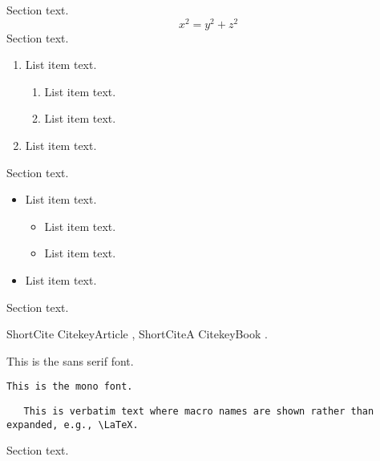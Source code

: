 \documentclass[published]{agujournal2025_4.22.25}
\begin{document}
Section text.
 \begin{equation}
 x^2=y^2 + z^2
 \end{equation}
Section text.
%
\begin{enumerate}
    \item List item text.
        \begin{enumerate} %
          \item List item text.
          \item List item text.
        \end{enumerate}
    \item List item text.
\end{enumerate}
Section text.
\begin{itemize}
    \item List item text.
        \begin{itemize}
          \item List item text. 
          \item List item text.
        \end{itemize}
    \item List item text.
\end{itemize}
Section text.

ShortCite CitekeyArticle \cite{CitekeyArticle}, ShortCiteA CitekeyBook . 

\textsf{This is the sans serif font.}

 \texttt{This is the mono font.}
 

\begin{verbatim}  
   This is verbatim text where macro names are shown rather than expanded, e.g., \LaTeX.
\end{verbatim}

Section text.



%
\end{document}

